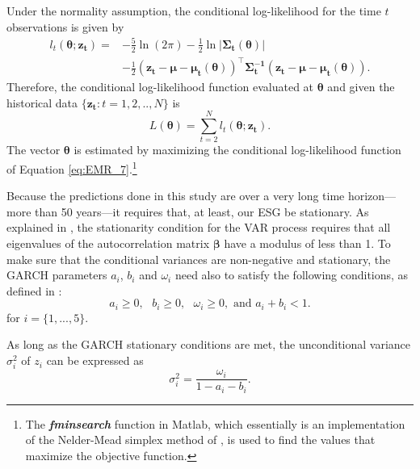 \documentclass{sfuthesis}
\numberwithin{equation}{chapter}
\begin{document}
	
		\justify
		Under the normality assumption, the conditional log-likelihood for the time $t$ observations is given by
		\begin{equation}
		\label{eq:EMR_6}
		\begin{split}
		l_t(\boldsymbol{\theta; z_{t}})  = & -\frac{5}{2}\ln(2\pi) - \frac{1}{2}\ln|\boldsymbol{\Sigma_{t}(\theta)}| \\
		& - \frac{1}{2}\boldsymbol{(z_{t} -\mu -\mu_{t}(\theta))^\top \Sigma_{t}^{-1} (z_{t} -\mu -\mu_{t}(\theta))}.
		\end{split}
		\end{equation}
		Therefore, the conditional log-likelihood function evaluated at $\boldsymbol{\theta}$ and given the historical data $\{\boldsymbol{z_{t}}: t=1, 2, .., N\}$ is 
		\begin{equation}
		\label{eq:EMR_7}
		L(\boldsymbol{\theta}) = \sum_{t=2}^{N}l_{t}(\boldsymbol{\theta; z_{t}}).
		\end{equation}
		The vector $\boldsymbol{\theta}$ is estimated by maximizing the conditional log-likelihood function of Equation \eqref{eq:EMR_7}.\footnote{The \textbf{\textit{fminsearch}} function in Matlab, which essentially is an implementation of the Nelder-Mead simplex method of \citet{Lagarias1998}, is used to find the values that maximize the objective function.}
	
	
		\justify
		Because the predictions done in this study are over a very long time horizon---more than 50 years---it requires that, at least, our ESG be stationary. As explained in \citet{Lutkepohl2005}, the stationarity condition for the VAR process requires that all eigenvalues of the autocorrelation matrix $\boldsymbol{\beta}$ have a modulus of less than 1. To make sure that the conditional variances are non-negative and stationary, the GARCH parameters $a_{i}$, $b_{i}$ and $\omega_{i}$ need also to satisfy the following conditions, as defined in \citet{Bollerslev1986}:
		\begin{equation}
		\label{eq:EMR_8}
		a_{i}\geqslant 0, \text{ } b_{i}\geqslant 0, \text{ } \omega_{i}\geqslant 0, \text{ and } a_{i} + b_{i} <1.
		\end{equation}
		for $i = \{1,...,5\}$.
	
	
		\justify
		As long as the GARCH stationary conditions are met, the unconditional variance $\sigma_i^2$ of $z_i$ can be expressed as
		\begin{equation}
		\label{eq:EMR_9}
		\sigma_i^2 = \frac{\omega_i}{1-a_{i}-b_{i}}.
		\end{equation}
	
\end{document}
